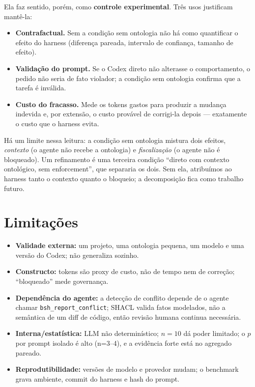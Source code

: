 \documentclass[11pt,a4paper]{article}
\begin{document}
Ela faz sentido, porém, como \textbf{controle experimental}. Três usos justificam mantê-la:
\begin{itemize}[leftmargin=1.4em]
\item \textbf{Contrafactual.} Sem a condição sem ontologia não há como quantificar o efeito do harness (diferença pareada, intervalo de confiança, tamanho de efeito).
\item \textbf{Validação do prompt.} Se o Codex direto não alterasse o comportamento, o pedido não seria de fato violador; a condição sem ontologia confirma que a tarefa é inválida.
\item \textbf{Custo do fracasso.} Mede os tokens gastos para produzir a mudança indevida e, por extensão, o custo provável de corrigi-la depois --- exatamente o custo que o harness evita.
\end{itemize}
Há um limite nessa leitura: a condição sem ontologia mistura dois efeitos, \emph{contexto} (o agente não recebe a ontologia) e \emph{fiscalização} (o agente não é bloqueado). Um refinamento é uma terceira condição ``direto com contexto ontológico, sem enforcement'', que separaria os dois. Sem ela, atribuímos ao harness tanto o contexto quanto o bloqueio; a decomposição fica como trabalho futuro.

\section{Limitações}
\begin{itemize}[leftmargin=1.4em]
\item \textbf{Validade externa:} um projeto, uma ontologia pequena, um modelo e uma versão do Codex; não generaliza sozinho.
\item \textbf{Constructo:} tokens são proxy de custo, não de tempo nem de correção; ``bloqueado'' mede governança.
\item \textbf{Dependência do agente:} a detecção de conflito depende de o agente chamar \texttt{bsh\_report\_conflict}; SHACL valida fatos modelados, não a semântica de um diff de código, então revisão humana continua necessária.
\item \textbf{Interna/estatística:} LLM não determinístico; $n=10$ dá poder limitado; o $p$ por prompt isolado é alto (n=3--4), e a evidência forte está no agregado pareado.
\item \textbf{Reprodutibilidade:} versões de modelo e provedor mudam; o benchmark grava ambiente, commit do harness e hash do prompt.
\end{itemize}
\end{document}
